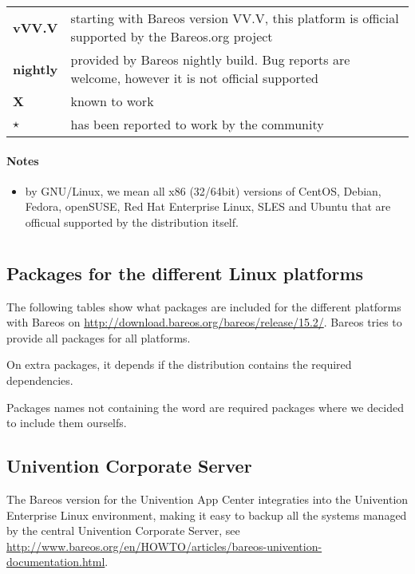 \begin{tabular}[h]{l l}
\textbf{vVV.V}   & starting with Bareos version VV.V, this platform is official supported by the Bareos.org project \\
\textbf{nightly} & provided by Bareos nightly build. Bug reports are welcome, however it is not official supported \\
\textbf{X}       & known to work \\
\textbf{$\star$} & has been reported to work by the community\\
\end{tabular}

\paragraph{Notes}

\begin{itemize}
    \item by GNU/Linux, we mean all x86 (32/64bit) versions of CentOS, Debian, Fedora, openSUSE, Red Hat Enterprise Linux, SLES and Ubuntu that are officual supported  by the distribution itself.
\end{itemize}

\section{}

\subsection{Packages for the different Linux platforms}
\label{sec:packages}

The following tables show what packages are included for the different platforms with Bareos on \url{http://download.bareos.org/bareos/release/15.2/}.
Bareos tries to provide all packages for all platforms.

On extra packages, it depends if the distribution contains the required dependencies.

Packages names not containing the word  are required packages where we decided to include them ourselfs.

{
    \small
    
    
    
}



\subsection{Univention Corporate Server}
The Bareos version for the Univention App Center integraties into the Univention Enterprise Linux environment, making it easy to backup all the systems managed by the central Univention Corporate Server, see \url{http://www.bareos.org/en/HOWTO/articles/bareos-univention-documentation.html}.

